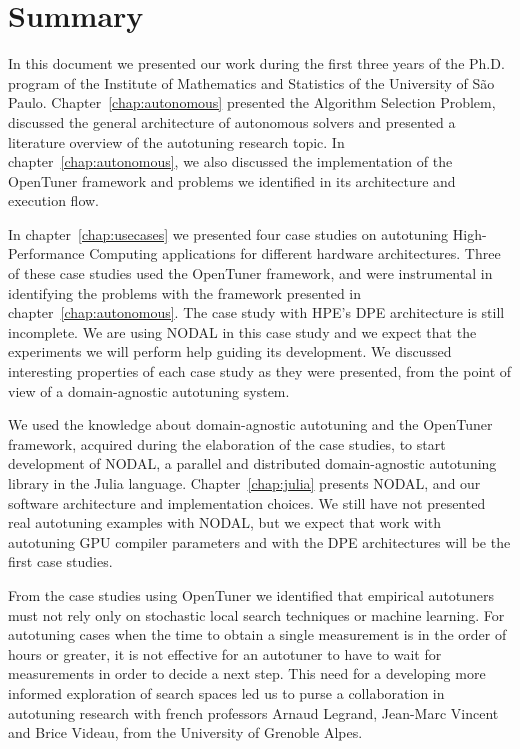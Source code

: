 \chapter{Summary}
\label{chap:final-summary}

In this document we presented our work during the first three years of the
Ph.D.  program of the Institute of Mathematics and Statistics of the University
of São Paulo. Chapter~\ref{chap:autonomous} presented the Algorithm Selection
Problem, discussed the general architecture of autonomous solvers and presented
a literature overview of the autotuning research topic. In
chapter~\ref{chap:autonomous}, we also discussed the implementation of the
OpenTuner framework and problems we identified in its architecture and
execution flow.

In chapter~\ref{chap:usecases} we presented four case studies on autotuning
High-Performance Computing applications for different hardware architectures.
Three of these case studies used the OpenTuner framework, and were instrumental
in identifying the problems with the framework presented in
chapter~\ref{chap:autonomous}. The case study with HPE's DPE architecture is
still incomplete. We are using NODAL in this case study and we expect that the
experiments we will perform help guiding its development.  We discussed
interesting properties of each case study as they were presented, from the
point of view of a domain-agnostic autotuning system.

We used the knowledge about domain-agnostic autotuning and the OpenTuner
framework, acquired during the elaboration of the case studies, to start
development of NODAL, a parallel and distributed domain-agnostic autotuning
library in the Julia language. Chapter~\ref{chap:julia} presents NODAL, and our
software architecture and implementation choices. We still have not presented
real autotuning examples with NODAL, but we expect that work with autotuning
GPU compiler parameters and with the DPE architectures will be the first case
studies.

From the case studies using OpenTuner we identified that empirical autotuners
must not rely only on stochastic local search techniques or machine learning.
For autotuning cases when the time to obtain a single measurement is in the
order of hours or greater, it is not effective for an autotuner to have to wait
for measurements in order to decide a next step. This need for a developing
more informed exploration of search spaces led us to purse a collaboration in
autotuning research with french professors Arnaud Legrand, Jean-Marc Vincent
and Brice Videau, from the University of Grenoble Alpes.


